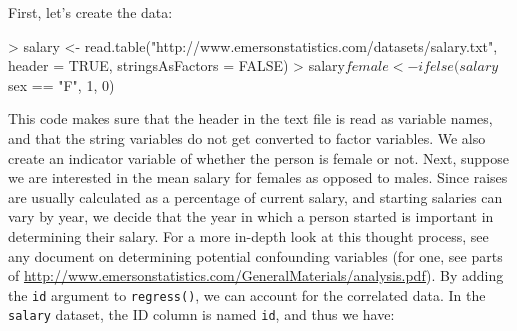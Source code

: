 \documentclass[landscape]{article}
\renewenvironment{Schunk}{\vspace{\topsep}}{\vspace{\topsep}}
\begin{document}
First, let's create the data:
\begin{Schunk}
\begin{Sinput}
> salary <- read.table("http://www.emersonstatistics.com/datasets/salary.txt", header = TRUE, stringsAsFactors = FALSE)
> salary$female <- ifelse(salary$sex == "F", 1, 0)
\end{Sinput}
\end{Schunk}
This code makes sure that the header in the text file is read as variable names, and that the string variables do not get converted to factor variables. We also create an indicator variable of whether the person is female or not. Next, suppose we are interested in the mean salary for females as opposed to males. Since raises are usually calculated as a percentage of current salary, and starting salaries can vary by year, we decide that the year in which a person started is important in determining their salary. For a more in-depth look at this thought process, see any document on determining potential confounding variables (for one, see parts of \url{http://www.emersonstatistics.com/GeneralMaterials/analysis.pdf}). By adding the \texttt{id} argument to \texttt{regress()}, we can account for the correlated data. In the \texttt{salary} dataset, the ID column is named \texttt{id}, and thus we have:
\end{document}
